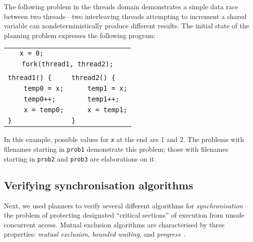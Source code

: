 The following problem in the threads domain demonstrates a simple data race between two threads---two interleaving threads attempting to increment a shared variable can nondeterministically produce different results. The initial state of the planning problem expresses the following program:
%
	\begin{center} \small
	\begin{tabular}{ll}
	\multicolumn{2}{c}{\texttt{x = 0;~~~~~~~~~~~~~~~~~~}} \\
	\multicolumn{2}{c}{\texttt{fork(thread1, thread2);}} \\
	& \\
	\texttt{thread1() \{} & \texttt{thread2() \{} \\
	\texttt{~~~~temp0 = x;\qquad} & \texttt{~~~~temp1 = x;} \\
	\texttt{~~~~temp0++;} & \texttt{~~~~temp1++;} \\
	\texttt{~~~~x = temp0;} & \texttt{~~~~x = temp1;} \\
	\texttt{\}} & \texttt{\}} \\
	\end{tabular}
	\end{center}
%
In this example, possible values for \texttt{x} at the end are 1 and 2. The problems with filenames starting in \texttt{prob1} demonstrate this problem; those with filenames starting in \texttt{prob2} and \texttt{prob3} are elaborations on it.

\subsection{Verifying synchronisation algorithms}

Next, we used planners to verify several different algorithms for {\em synchronisation} -- the problem of protecting designated ``critical sections'' of execution from unsafe concurrent access. Mutual exclusion algorithms are characterised by three properties: {\em mutual exclusion}, {\em bounded waiting}, and {\em progress}~\cite{de0u}.

